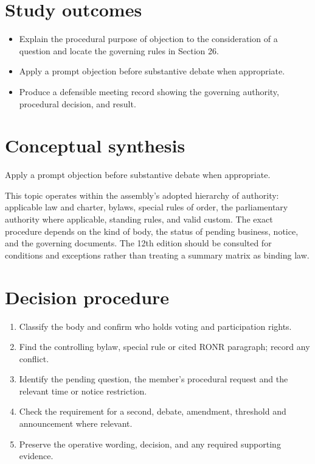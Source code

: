 \documentclass[11pt]{article}
\begin{document}
\SuiteOpen
{}
\section{Study outcomes}
\begin{itemize}[leftmargin=*,itemsep=4pt]
\item Explain the procedural purpose of objection to the consideration of a question and locate the governing rules in Section 26.
\item Apply a prompt objection before substantive debate when appropriate.
\item Produce a defensible meeting record showing the governing authority, procedural decision, and result.
\end{itemize}

\section{Conceptual synthesis}
Apply a prompt objection before substantive debate when appropriate.

This topic operates within the assembly’s adopted hierarchy of authority: applicable law and charter, bylaws, special rules of order, the parliamentary authority where applicable, standing rules, and valid custom. The exact procedure depends on the kind of body, the status of pending business, notice, and the governing documents. The 12th edition should be consulted for conditions and exceptions rather than treating a summary matrix as binding law.
\section{Decision procedure}
\begin{enumerate}[leftmargin=*,itemsep=4pt]
\item Classify the body and confirm who holds voting and participation rights.
\item Find the controlling bylaw, special rule or cited RONR paragraph; record any conflict.
\item Identify the pending question, the member’s procedural request and the relevant time or notice restriction.
\item Check the requirement for a second, debate, amendment, threshold and announcement where relevant.
\item Preserve the operative wording, decision, and any required supporting evidence.
\end{enumerate}
\end{document}
